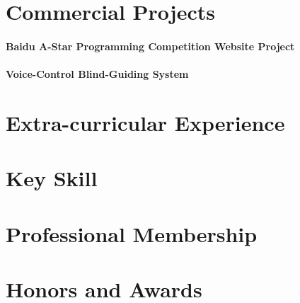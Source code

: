 \documentclass{article}
\begin{document}
\section{Commercial Projects}
\paragraph{Baidu A-Star Programming Competition Website Project}
\paragraph{Voice-Control Blind-Guiding System}
\section{Extra-curricular Experience}
\section{Key Skill}
\section{Professional Membership}
\section{Honors and Awards}
\end{document}
